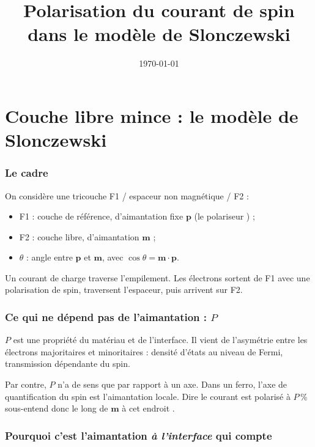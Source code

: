 \documentclass[11pt,a4paper]{article}
\title{Polarisation du courant de spin dans le modèle de Slonczewski}
\author{}
\date{\today}
\newcommand{\vm}{\bm{m}}
\newcommand{\vp}{\bm{p}}
\begin{document}
\maketitle

\part{Couche libre mince : le modèle de Slonczewski}

\section{Le cadre}

On considère une tricouche F1 / espaceur non magnétique / F2 :
\begin{itemize}
  \item F1 : couche de référence, d'aimantation fixe $\vp$ (le
    \og polariseur \fg) ;
  \item F2 : couche libre, d'aimantation $\vm$ ;
  \item $\theta$ : angle entre $\vp$ et $\vm$, avec $\cos\theta = \vm\cdot\vp$.
\end{itemize}
Un courant de charge traverse l'empilement. Les électrons sortent de F1
avec une polarisation de spin, traversent l'espaceur, puis arrivent sur F2.

\section{Ce qui ne dépend pas de l'aimantation : \texorpdfstring{$P$}{P}}

$P$ est une propriété du matériau et de l'interface. Il vient de
l'asymétrie entre les électrons majoritaires et minoritaires : densité
d'états au niveau de Fermi, transmission dépendante du spin.

Par contre, $P$ n'a de sens que par rapport à un axe. Dans un ferro,
l'axe de quantification du spin est l'aimantation locale. Dire
\og le courant est polarisé à $P$\,\% \fg{} sous-entend donc
\og le long de $\vm$ à cet endroit \fg.

\section{Pourquoi c'est l'aimantation \emph{à l'interface} qui compte}
\end{document}
